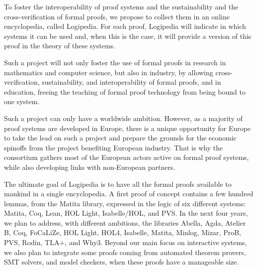 To foster the interoperability of proof systems and the sustainability
and the cross-verification of formal proofs, we propose to collect
them in an online encyclopedia, called Logipedia.  For each proof,
Logipedia will indicate in which systems it can be used and, when this
is the case, it will provide a version of this proof in the theory of
these systems.

Such a project will not only foster the use of formal proofs in
research in mathematics and computer science, but also in industry, by
allowing cross-verification, sustainability, and interoperability of
formal proofs, and in education, freeing the teaching of formal proof
technology from being bound to one system.

Such a project can only have a worldwide ambition. However, as a
majority of proof systems are developed in Europe, there is a unique
opportunity for Europe to take the lead on such a project and prepare
the grounds for the economic spinoffs from the project benefiting
European industry. That is why the consortium gathers most of the
European actors active on formal proof systems, while also developing
links with non-European partners.

The ultimate goal of Logipedia is to have all the formal proofs
available to mankind in a single encyclopedia.  A first proof of
concept contains a few hundred lemmas, from the Matita library,
expressed in the logic of six different systems: Matita, Coq, Lean,
HOL Light, Isabelle/HOL, and PVS.  In the next four years, we plan to
address, with different ambitions, the libraries Abella, Agda, Atelier
B, Coq, FoCaLiZe, HOL Light, HOL4, Isabelle, Matita, Minlog, Mizar,
ProB, PVS, Rodin, TLA+, and Why3.  Beyond our main focus on interactive
systems, we also plan to integrate some proofs coming from automated
theorem provers, SMT solvers, and model checkers, when these proofs
have a manageable size.


